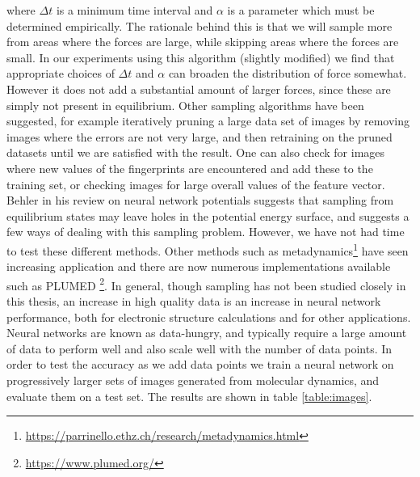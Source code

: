 where $\Delta t$ is a minimum time interval and $\alpha$ is a parameter
which must be determined empirically.
The rationale behind this is that we will sample more from
areas where the forces are large, while skipping areas
where the forces are small.
In our experiments using this algorithm (slightly modified)
we find that appropriate choices of $\Delta t$ and $\alpha$
can broaden the distribution of force somewhat.
However it does not add a substantial amount of larger forces, since
these are simply not present in equilibrium.
Other sampling algorithms have been suggested, for example iteratively
pruning a large data set of images by removing images where
the errors are not very large, and then retraining on the pruned datasets
until we are satisfied with the result.
One can also check for images where new values of the fingerprints
are encountered and add these to the training set, or checking
images for large overall values of the feature vector. 
Behler in his review\cite{behler2011neural} on neural network potentials
suggests that sampling from equilibrium states may leave holes
in the potential energy surface, and suggests a few ways of dealing
with this sampling problem.
However, we have not had time to test these different methods.
Other methods such as metadynamics\footnote{
\url{https://parrinello.ethz.ch/research/metadynamics.html}}
have seen increasing application and there are now numerous implementations
available such as PLUMED \footnote{\url{https://www.plumed.org/}}.
In general, though sampling has not been studied closely in this thesis,
an increase in high quality data is an increase in neural network
performance, both for electronic structure calculations
and for other applications.
Neural networks are known as data-hungry, and typically require
a large amount of data to perform well and also scale well
with the number of data points. In order to test the accuracy as we add data points
we train a neural network on progressively larger sets of images generated 
from molecular dynamics, and evaluate them on a test set.
The results are shown in table \ref{table:images}.

